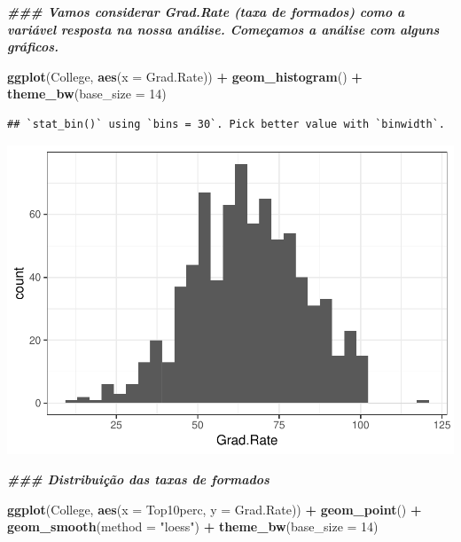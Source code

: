 \documentclass[
]{article}
\newenvironment{Shaded}{\begin{snugshade}}{\end{snugshade}}
\newcommand{\AttributeTok}[1]{\textcolor[rgb]{0.13,0.29,0.53}{#1}}
\newcommand{\DecValTok}[1]{\textcolor[rgb]{0.00,0.00,0.81}{#1}}
\newcommand{\DocumentationTok}[1]{\textcolor[rgb]{0.56,0.35,0.01}{\textbf{\textit{#1}}}}
\newcommand{\FunctionTok}[1]{\textcolor[rgb]{0.13,0.29,0.53}{\textbf{#1}}}
\newcommand{\NormalTok}[1]{#1}
\newcommand{\SpecialCharTok}[1]{\textcolor[rgb]{0.81,0.36,0.00}{\textbf{#1}}}
\newcommand{\StringTok}[1]{\textcolor[rgb]{0.31,0.60,0.02}{#1}}
\begin{document}
\begin{Shaded}
\begin{Highlighting}[]
\DocumentationTok{\#\#\# Vamos considerar Grad.Rate (taxa de formados) como a variável resposta na nossa análise. Começamos a análise com alguns gráficos.}

\FunctionTok{ggplot}\NormalTok{(College, }\FunctionTok{aes}\NormalTok{(}\AttributeTok{x =}\NormalTok{ Grad.Rate)) }\SpecialCharTok{+} \FunctionTok{geom\_histogram}\NormalTok{() }\SpecialCharTok{+}
    \FunctionTok{theme\_bw}\NormalTok{(}\AttributeTok{base\_size =} \DecValTok{14}\NormalTok{)}
\end{Highlighting}
\end{Shaded}

\begin{verbatim}
## `stat_bin()` using `bins = 30`. Pick better value with `binwidth`.
\end{verbatim}

\includegraphics{Modelos_Estatisticos-2024-08-10_files/figure-latex/unnamed-chunk-6-1.pdf}

\begin{Shaded}
\begin{Highlighting}[]
\DocumentationTok{\#\#\# Distribuição das taxas de formados}

\FunctionTok{ggplot}\NormalTok{(College, }\FunctionTok{aes}\NormalTok{(}\AttributeTok{x =}\NormalTok{ Top10perc, }\AttributeTok{y =}\NormalTok{ Grad.Rate)) }\SpecialCharTok{+} \FunctionTok{geom\_point}\NormalTok{() }\SpecialCharTok{+}
    \FunctionTok{geom\_smooth}\NormalTok{(}\AttributeTok{method =} \StringTok{"loess"}\NormalTok{) }\SpecialCharTok{+} 
    \FunctionTok{theme\_bw}\NormalTok{(}\AttributeTok{base\_size =} \DecValTok{14}\NormalTok{)}
\end{Highlighting}
\end{Shaded}
\end{document}
